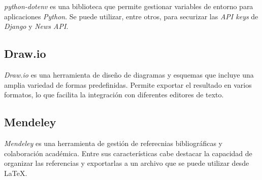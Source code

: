 \emph{python-dotenv} \citep{online:dotenv} es una biblioteca que permite gestionar variables de entorno para aplicaciones \emph{Python}. Se puede utilizar, entre otros, para securizar las \emph{API keys} de \emph{Django} y \emph{News API}. 

\subsection{Draw.io}\label{draw_io}

\emph{Draw.io} \citep{online:drawio} es una herramienta de diseño de diagramas y esquemas que incluye una amplia variedad de formas predefinidas. Permite exportar el resultado en varios formatos, lo que facilita la integración con diferentes editores de texto. 

\subsection{Mendeley}\label{mendeley}

\emph{Mendeley} \citep{online:mendeley} es una herramienta de gestión de referecnias bibliográficas y colaboración académica. Entre sus características cabe destacar la capacidad de organizar las referencias y exportarlas a un archivo que se puede utilizar desde \LaTeX. 
